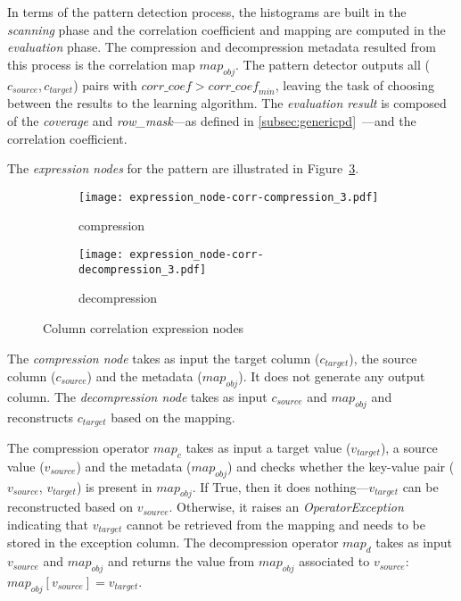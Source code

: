 In terms of the pattern detection process, the histograms are built in the \textit{scanning} phase and the correlation coefficient and mapping are computed in the \textit{evaluation} phase. The compression and decompression metadata resulted from this process is the correlation map \(map_{obj}\). The pattern detector outputs all (\(c_{source}, c_{target}\)) pairs with \(\mathit{corr\_coef} > \mathit{corr\_coef}_{min}\), leaving the task of choosing between the results to the learning algorithm. The \textit{evaluation result} is composed of the \textit{coverage} and \textit{row\_mask}---as defined in \ref{subsec:genericpd}~---and the correlation coefficient.

The \textit{expression nodes} for the  pattern are illustrated in Figure~\ref{fig:pd:columncorrelation:exprnode}.

\begin{figure}[h]
  \centering
  \begin{subfigure}[t]{0.45\linewidth}
    \centering
    \texttt{[image: expression\_node-corr-compression\_3.pdf]}
    \caption[b]{compression}
    \label{fig:pd:columncorrelation:exprnode:compression}
  \end{subfigure}
  \hspace{3em}
  \begin{subfigure}[t]{0.30\linewidth}
    \centering
    \texttt{[image: expression\_node-corr-decompression\_3.pdf]}
    \caption[b]{decompression}
    \label{fig:pd:columncorrelation:exprnode:decompression}
  \end{subfigure}
  \caption{Column correlation expression nodes}
  \label{fig:pd:columncorrelation:exprnode}
\end{figure}

The \textit{compression node} takes as input the target column (\(c_{target}\)), the source column (\(c_{source}\)) and the metadata (\(map_{obj}\)). It does not generate any output column. The \textit{decompression node} takes as input \(c_{source}\) and \(map_{obj}\) and reconstructs \(c_{target}\) based on the mapping.

The compression operator \(map_{c}\) takes as input a target value (\(v_{target}\)), a source value (\(v_{source}\)) and the metadata (\(map_{obj}\)) and checks whether the key-value pair (\(v_{source}\), \(v_{target}\)) is present in \(map_{obj}\). If True, then it does nothing---\(v_{target}\) can be reconstructed based on \(v_{source}\). Otherwise, it raises an \textit{OperatorException} indicating that \(v_{target}\) cannot be retrieved from the mapping and needs to be stored in the exception column. The decompression operator \(map_{d}\) takes as input \(v_{source}\) and \(map_{obj}\) and returns the value from \(map_{obj}\) associated to \(v_{source}\): \(map_{obj}[v_{source}] = v_{target}\).


